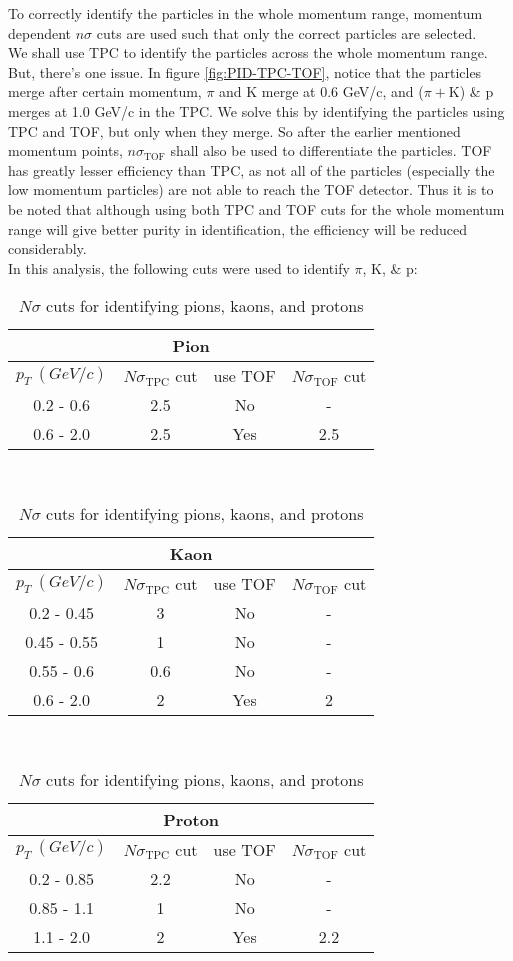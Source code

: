 \documentclass[12pt,a4paper,twoside]{report}
\begin{document}
To correctly identify the particles in the whole momentum range, momentum dependent $n\sigma$ cuts are used such that only the correct particles are selected.\\
We shall use TPC to identify the particles across the whole momentum range. But, there's one issue. In figure \ref{fig:PID-TPC-TOF}, notice that the particles merge after certain momentum, $\pi$ and K merge at 0.6 GeV/c, and ($\pi+\mathrm{K}$) \& p merges at 1.0 GeV/c in the TPC. We solve this by identifying the particles using TPC and TOF, but only when they merge. So after the earlier mentioned momentum points, $n\sigma_\mathrm{TOF}$ shall also be used to differentiate the particles. TOF has greatly lesser efficiency than TPC, as not all of the particles (especially the low momentum particles) are not able to reach the TOF detector. Thus it is to be noted that although using both TPC and TOF cuts for the whole momentum range will give better purity in identification, the efficiency will be reduced considerably.
\\
In this analysis, the following cuts were used to identify $\pi$, K, \& p:\\
\begin{table}[H]
	\centering
	\begin{tabular}{|c|c|c|c|}
		\hline
		\multicolumn{4}{|c|}{Pion} \\
		\hline
		$p_T\ (GeV/c)$ & $N\sigma_\mathrm{TPC}$ cut & use TOF & $N\sigma_\mathrm{TOF}$ cut \\
		\hline
		0.2 - 0.6 & 2.5 & No & - \\
		0.6 - 2.0 & 2.5 & Yes & 2.5 \\
		\hline
	\end{tabular}
\\\vspace*{1cm}
	\begin{tabular}{|c|c|c|c|}
		\hline
		\multicolumn{4}{|c|}{Kaon} \\
		\hline
		$p_T\ (GeV/c)$ & $N\sigma_\mathrm{TPC}$ cut & use TOF & $N\sigma_\mathrm{TOF}$ cut \\
		\hline
		0.2 - 0.45 & 3 & No & - \\
		0.45 - 0.55 & 1 & No & - \\
		0.55 - 0.6 & 0.6 & No & -\\
		0.6 - 2.0 & 2 & Yes & 2 \\
		\hline
	\end{tabular}
\\\vspace*{1cm}
	\begin{tabular}{|c|c|c|c|}
		\hline
		\multicolumn{4}{|c|}{Proton} \\
		\hline
		$p_T\ (GeV/c)$ & $N\sigma_\mathrm{TPC}$ cut & use TOF & $N\sigma_\mathrm{TOF}$ cut \\
		\hline
		0.2 - 0.85 & 2.2 & No & - \\
		0.85 - 1.1 & 1 & No & - \\
		1.1 - 2.0 & 2 & Yes & 2.2 \\
		\hline
	\end{tabular}
\caption{\label{tbl:pidcuts}$N\sigma$ cuts for identifying pions, kaons, and protons}
\end{table}
\end{document}
